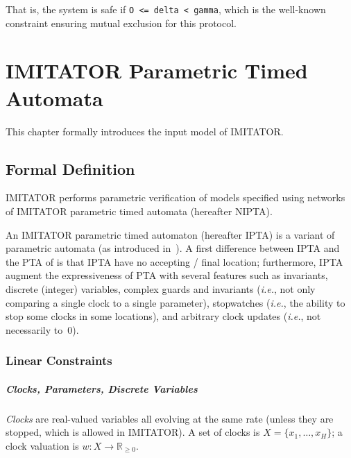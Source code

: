 \documentclass[a4paper,11pt]{report}
\makeatletter
\newcommand{\Clock}{X} %
\newcommand{\ClockCard}{H} %
\newcommand{\clock}{x} %
\newcommand{\clockval}{w} %
\newcommand{\grandr}{{\mathbb R}}
\newcommand{\grandrplus}{\grandr_{\geq 0}}
\newcommand{\imitator}{\textsf{IMITATOR}}
\newcommand{\IPTA}{IPTA}
\newcommand{\NIPTA}{NIPTA}
\newcommand{\styleIMI}[1]{\textcolor{imicolor}{\texttt{#1}}}
\newcommand{\ie}{\textcolor{colorok}{\textit{i.e.},\@}}
\makeatother
\begin{document}
That is, the system is safe if \styleIMI{O <= delta < gamma}, which is the well-known constraint ensuring mutual exclusion for this protocol.




\chapter{IMITATOR Parametric Timed Automata}\label{section:IPTA}


This chapter formally introduces the input model of \imitator{}.

\section{Formal Definition}\label{section:NIPTA}

\imitator{} performs parametric verification of models specified using networks of \imitator{} parametric timed automata (hereafter \NIPTA{}).

An \imitator{} parametric timed automaton (hereafter \IPTA{}) is a variant of parametric automata (as introduced in~\cite{AHV93}).
A first difference between \IPTA{} and the PTA of \cite{AHV93} is that \IPTA{} have no accepting / final location;
furthermore, \IPTA{} augment the expressiveness of PTA with several features such as invariants, discrete (integer) variables, complex guards and invariants (\ie{} not only comparing a single clock to a single parameter), stopwatches (\ie{} the ability to stop some clocks in some locations), and arbitrary clock updates (\ie{} not necessarily to~0).


\subsection{Linear Constraints}


\paragraph{Clocks, Parameters, Discrete Variables}
\emph{Clocks} are real-valued variables all evolving at the same rate (unless they are stopped, which is allowed in \imitator{}).
A set of clocks is $\Clock = \{ \clock_1, \dots, \clock_\ClockCard \}$;
a clock valuation is
$\clockval \colon \Clock \rightarrow \grandrplus$.
\end{document}
